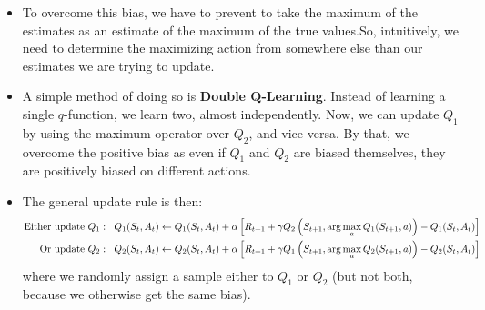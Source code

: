 \begin{itemize}
	\item To overcome this bias, we have to prevent to take the maximum of the estimates as an estimate of the maximum of the true values.So, intuitively, we need to determine the maximizing action from somewhere else than our estimates we are trying to update.
	\item A simple method of doing so is \textbf{Double Q-Learning}. Instead of learning a single $q$-function, we learn two, almost independently. Now, we can update $Q_1$ by using the maximum operator over $Q_2$, and vice versa. By that, we overcome the positive bias as even if $Q_1$ and $Q_2$ are biased themselves, they are positively biased on different actions. 
	\item The general update rule is then:
	\begin{equation*}
		\begin{split}
			\text{Either update }Q_1: \hspace{2mm} Q_1(S_t,A_t) & \leftarrow Q_1(S_t,A_t) + \alpha\left[R_{t+1}+\gamma Q_2\left(S_{t+1},\arg\max_a Q_1(S_{t+1},a)\right)-Q_1(S_t,A_t)\right]\\
			\text{Or update }Q_2: \hspace{2mm} Q_2(S_t,A_t) & \leftarrow Q_2(S_t,A_t) + \alpha\left[R_{t+1}+\gamma Q_1\left(S_{t+1},\arg\max_a Q_2(S_{t+1},a)\right)-Q_2(S_t,A_t)\right]
		\end{split}
	\end{equation*}
	where we randomly assign a sample either to $Q_1$ or $Q_2$ (but not both, because we otherwise get the same bias).
\end{itemize}


